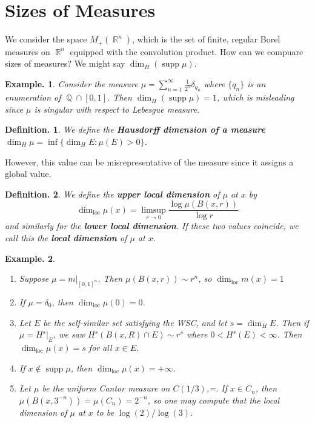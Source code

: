 \documentclass[11pt, a4paper]{memoir}
\DeclareMathOperator{\Q}{{\mathbb{Q}}}
\DeclareMathOperator{\R}{{\mathbb{R}}}
\theoremstyle{change}
\theoremstyle{plain}
\theoremstyle{nonumberplain}
\newtheorem{definition}{Definition.}
\newtheorem{example}{Example.}
\DeclareMathOperator{\supp}{supp}
\newcommand{\defn}[1]{{\boldmath\bfseries #1}}
\DeclareMathOperator{\loc}{loc}
\numberwithin{equation}{section}
\begin{document}
\section{Sizes of Measures}
We consider the space $M_+(\R^n)$, which is the set of finite, regular Borel measures on $\R^n$ equipped with the convolution product.
How can we compuare sizes of measures?
We might say $\dim_H(\supp\mu)$.
\begin{example}
    Consider the measure $\mu=\sum_{n=1}^\infty\frac{1}{2^n}\delta_{q_n}$ where $\{q_n\}$ is an enumeration of $\Q\cap[0,1]$.
    Then $\dim_H(\supp\mu)=1$, which is misleading since $\mu$ is singular with respect to Lebesgue measure.
\end{example}
\begin{definition}
    We define the \defn{Hausdorff dimension of a measure} $\dim_H\mu=\inf\{\dim_H E:\mu(E)>0\}$.
\end{definition}
However, this value can be misrepresentative of the measure since it assigns a global value.
\begin{definition}
    We define the \defn{upper local dimension} of $\mu$ at $x$ by
    \begin{equation*}
        \overline{\dim}_{\loc}\mu(x) = \limsup_{r\to 0}\frac{\log \mu(B(x,r))}{\log r}
    \end{equation*}
    and similarly for the \defn{lower local dimension}.
    If these two values coincide, we call this the \defn{local dimension} of $\mu$ at $x$.
\end{definition}
\begin{example}
    \begin{enumerate}[nl]
        \item Suppose $\mu=m|_{[0,1]^n}$.
            Then $\mu(B(x,r))\sim r^n$, so $\dim_{\loc}m(x)=1$
        \item If $\mu=\delta_0$, then $\dim_{\loc}\mu(0)=0$.
        \item Let $E$ be the self-similar set satisfying the WSC, and let $s=\dim_H E$.
            Then if $\mu=H^s|_E$, we saw $H^s(B(x,R)\cap E)\sim r^s$ where $0<H^s(E)<\infty$.
            Then $\dim_{\loc}\mu(x)=s$ for all $x\in E$.
        \item If $x\notin\supp\mu$, then $\dim_{\loc}\mu(x)=+\infty$.
        \item Let $\mu$ be the uniform Cantor measure on $C(1/3)$,=.
            If $x\in C_n$, then $\mu(B(x,3^{-n}))=\mu(C_n)=2^{-n}$, so one may compute that the local dimension of $\mu$ at $x$ to be $\log(2)/\log(3)$.
    \end{enumerate}
\end{example}
\end{document}
